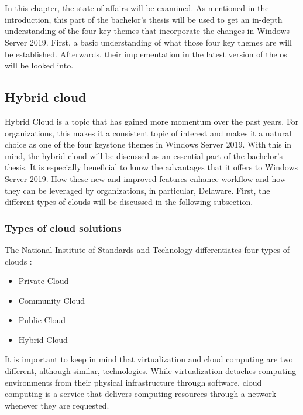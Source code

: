 \chapter{}
\label{ch:stand-van-zaken}
In this chapter, the state of affairs will be examined. 
As mentioned in the introduction, this part of the bachelor's thesis will be used to get an in-depth understanding of the four key themes that incorporate the changes in Windows Server 2019. 
First, a basic understanding of what those four key themes are will be established. 
Afterwards, their implementation in the latest version of the \acrshort{os} will be looked into.

\section{Hybrid cloud}
Hybrid Cloud is a topic that has gained more momentum over the past years. 
For organizations, this makes it a consistent topic of interest and makes it a natural choice as one of the four keystone themes in Windows Server 2019. \autocite{MWST2018} 
With this in mind, the hybrid cloud will be discussed as an essential part of the bachelor's thesis. 
It is especially beneficial to know the advantages that it offers to Windows Server 2019.
How these new and improved features enhance workflow and how they can be leveraged by organizations, in particular, Delaware. 
First, the different types of clouds will be discussed in the following subsection.

\subsection{Types of cloud solutions}
\label{subsection:typesofcloud}
The National Institute of Standards and Technology differentiates four types of clouds \autocite{Mell2011}:
\begin{itemize}
	\item Private Cloud
	\item Community Cloud
	\item Public Cloud
	\item Hybrid Cloud
\end{itemize}	
It is important to keep in mind that virtualization and cloud computing are two different, although similar, technologies. 
While virtualization detaches computing environments from their physical infrastructure through software, cloud computing is a service that delivers computing resources through a network whenever they are requested. \autocite{Naeem2016}

